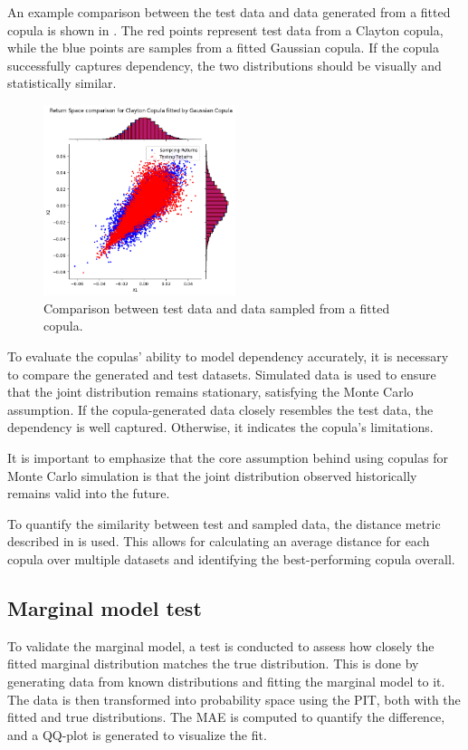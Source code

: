 An example comparison between the test data and data generated from a fitted copula is shown in . The red points represent test data from a Clayton copula, while the blue points are samples from a fitted Gaussian copula. If the copula successfully captures dependency, the two distributions should be visually and statistically similar.

\begin{figure}
\centering
\includegraphics[width=0.5\textwidth]{4Method/pictures/TestSampleComparison.png}
\caption{Comparison between test data and data sampled from a fitted copula.}
\label{fig:TestSampleComparison}
\end{figure}

To evaluate the copulas’ ability to model dependency accurately, it is necessary to compare the generated and test datasets. Simulated data is used to ensure that the joint distribution remains stationary, satisfying the Monte Carlo assumption. If the copula-generated data closely resembles the test data, the dependency is well captured. Otherwise, it indicates the copula’s limitations.

It is important to emphasize that the core assumption behind using copulas for Monte Carlo simulation is that the joint distribution observed historically remains valid into the future.

To quantify the similarity between test and sampled data, the distance metric described in  is used. This allows for calculating an average distance for each copula over multiple datasets and identifying the best-performing copula overall.

\subsection{Marginal model test}
To validate the marginal model, a test is conducted to assess how closely the fitted marginal distribution matches the true distribution. This is done by generating data from known distributions and fitting the marginal model to it. The data is then transformed into probability space using the \gls{PIT}, both with the fitted and true distributions. The \gls{MAE} is computed to quantify the difference, and a QQ-plot is generated to visualize the fit.

